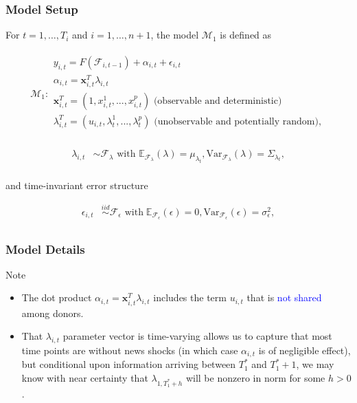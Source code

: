 \documentclass[9pt]{beamer}
\newcommand{\x}{\textbf{x}}
\newcommand{\simiid}{\stackrel{iid}{\sim}} %
\def\mrm#1{\mathrm{#1}} %
\def\mc#1{\mathcal{#1}} %
\def\E{\mathbb{E}} %
\def\mc#1{\mathcal{#1}}
\theoremstyle{definition}
\begin{document}
    \begin{frame}\frametitle{Model Setup}
    
    \fontsize{8}{7.2}
    
    For $t= 1, \ldots, T_i$ and $i = 1, \ldots, n+1$, the model $\mc{M}_1$ is defined as 

    \begin{align}
        \mc{M}_1 \colon 
    \begin{array}{l}
          y_{i,t} = F(\mathcal{F}_{i,t-1}) + \alpha_{i,t} + \epsilon_{i,t}\\[.2cm]
          \alpha_{i,t} = \x^{T}_{i,t}\lambda_{i,t} \\[.2cm]
         \x_{i,t}^{T} = (1,x^{1}_{i,t},...,x^{p}_{i,t}) \text{ (observable and deterministic)}\\[.2cm] 
         \lambda_{i,t}^{T} = (u_{i,t},\lambda^{1}_{t},...,\lambda^{p}_{t}) \text{ (unobservable and potentially random)},\\[.2cm]
        \end{array}
    \end{align}

    \begin{align*}
    \lambda_{i,t} &\sim \mc{F}_{\lambda}\text{ with }  \E_{\mathcal{F}_{\lambda}}(\lambda) = \mu_{\lambda_{t}}, \mrm{Var}_{\mc{F}_{\lambda}}(\lambda) = \Sigma_{\lambda_{t}},\\
    \end{align*}

    and time-invariant error structure

    \begin{align*}
        \epsilon_{i,t} &\simiid \mc{F}_{\epsilon} \text{ with}  \; \E_{\mc{F}_{\epsilon}}(\epsilon) = 0, \mrm{Var}_{\mc{F}_{\epsilon}}(\epsilon)  = \sigma^{2}_{\epsilon},  \\
    \end{align*}
    
    \end{frame}

    \begin{frame}\frametitle{Model Details}
        Note
        \begin{itemize}
            
            \item The dot product $\alpha_{i,t} = \x^{T}_{i,t}\lambda_{i,t}$ includes the term $u_{i,t}$ that is \textcolor{blue}{not shared} among donors.
            \item That $\lambda_{i,t}$ parameter vector is time-varying allows us to capture that most time points are without news shocks (in which case $\alpha_{i,t}$ is of negligible effect), but conditional upon information arriving between $T_{1}^{*}$ and $T_{1}^{*}+1$, we may know with near certainty that $\lambda_{1,T_{1}^{*}+h}$ will be nonzero in norm for some $h>0$. 
        \end{itemize}
    \end{frame}
    
\end{document}
